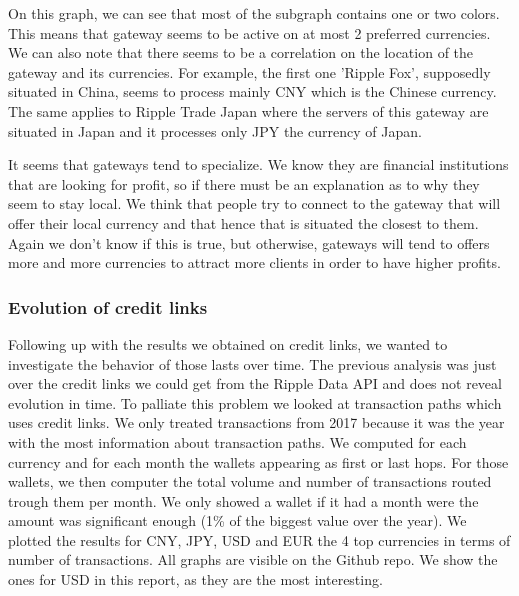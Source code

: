 On this graph, we can see that most of the subgraph contains one or two colors. This means that gateway seems to be active on at most 2 preferred currencies. We can also note that there seems to be a correlation on the location of the gateway and its currencies. For example, the first one 'Ripple Fox', supposedly situated in China, seems to process mainly CNY which is the Chinese currency. The same applies to Ripple Trade Japan where the servers of this gateway are situated in Japan and it processes only JPY the currency of Japan. 

It seems that gateways tend to specialize. We know they are financial institutions that are looking for profit, so if there must be an explanation as to why they seem to stay local. We think that people try to connect to the gateway that will offer their local currency and that hence that is situated the closest to them. Again we don't know if this is true, but otherwise, gateways will tend to offers more and more currencies to attract more clients in order to have higher profits.

\subsubsection{Evolution of credit links}
Following up with the results we obtained on credit links, we wanted to investigate the behavior of those lasts over time. The previous analysis was just over the credit links we could get from the Ripple Data API\cite{data-api} and does not reveal evolution in time. To palliate this problem we looked at transaction paths which uses credit links. We only treated transactions from 2017 because it was the year with the most information about transaction paths. We computed for each currency and for each month the wallets appearing as first or last hops. For those wallets, we then computer the total volume and number of transactions routed trough them per month. We only showed a wallet if it had a month were the amount was significant enough (1\% of the biggest value over the year). We plotted the results for CNY, JPY, USD and EUR the 4 top currencies in terms of number of transactions. All graphs are visible on the Github repo\cite{repo}. We show the ones for USD in this report, as they are the most interesting. 

